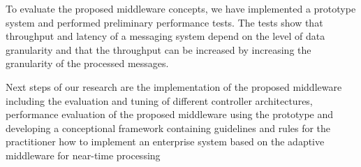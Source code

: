 To evaluate the proposed middleware concepts, we have implemented a prototype system and performed preliminary performance tests. The tests show that throughput and latency of a messaging system depend on the level of data granularity and that the throughput can be increased by increasing the granularity of the processed messages.

Next steps of our research are the implementation of the proposed middleware including the evaluation and tuning of different controller architectures, performance evaluation of the proposed middleware using the prototype and developing a conceptional framework containing guidelines and rules for the practitioner how to implement an enterprise system based on the adaptive middleware for near-time processing
